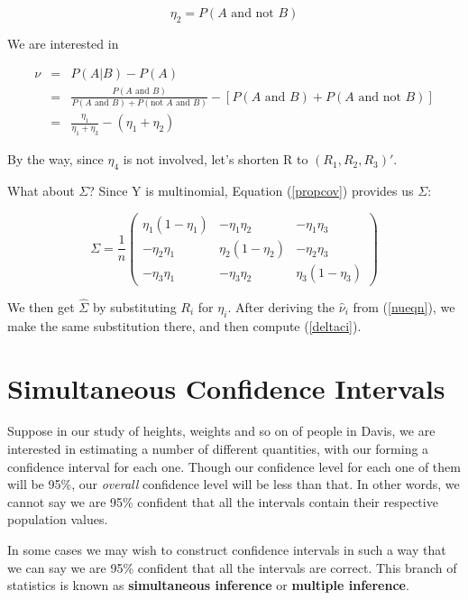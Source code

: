 \begin{equation}
\eta_2 = P(A\textrm{ and not }B)
\end{equation}

We are interested in

\begin{eqnarray}
\label{nueqn}
\nu &=& P(A|B) - P(A) \\
&=& \frac{P(A \textrm{ and } B)}
{P(A \textrm{ and }B) + P(\textrm{not }A \textrm{ and }B)} 
- \left [ P(A \textrm{ and } B) + P(A \textrm{ and not } B) \right ] \\
&=& \frac{\eta_1}{\eta_1+\eta_3} - (\eta_1+\eta_2)
\end{eqnarray}

By the way, since $\eta_4$ is not involved, let's shorten R to
$(R_1,R_2,R_3)'$.

What about $\Sigma$?  Since Y is multinomial, Equation (\ref{propcov})
provides us $\Sigma$:

\begin{equation}
\Sigma = 
\frac{1}{n}
\left (
\begin{array}{rrr}
\eta_1 (1-\eta_1) & -\eta_1 \eta_2 & -\eta_1 \eta_3 \\
-\eta_2 \eta_1 & \eta_2 (1-\eta_2) & -\eta_2 \eta_3 \\
-\eta_3 \eta_1 & -\eta_3 \eta_2 & \eta_3 (1-\eta_3) 
\end{array}
\right )
\end{equation}

We then get $\widehat{\Sigma}$ by substituting $R_i$ for $\eta_i$.
After deriving the $\widehat{\nu}_i$ from (\ref{nueqn}), we make the
same substitution there, and then compute (\ref{deltaci}).

\section{Simultaneous Confidence Intervals} 
\label{simultancis}

Suppose in our study of heights, weights and so on of people in Davis,
we are interested in estimating a number of different quantities, with
our forming a confidence interval for each one.  Though our confidence
level for each one of them will be 95\%, our {\it overall} confidence
level will be less than that.  In other words, we cannot say we are 95\%
confident that all the intervals contain their respective population
values.

In some cases we may wish to construct confidence intervals in such a
way that we can say we are 95\% confident that all the intervals are
correct.  This branch of statistics is known as {\bf simultaneous
inference} or {\bf multiple inference}.  

